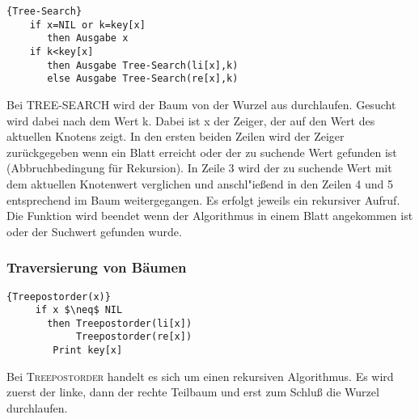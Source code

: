   \begin{Algorithmus}[H]
    \begin{lstlisting}[frame=tlrb, mathescape=true, title=\textsc{Tree-Search}, gobble=4]{Tree-Search}
    if x=NIL or k=key[x]
       then Ausgabe x
    if k<key[x]
       then Ausgabe Tree-Search(li[x],k)
       else Ausgabe Tree-Search(re[x],k)
    \end{lstlisting}

    Bei \textsc{TREE-SEARCH} wird der Baum von der Wurzel aus durchlaufen. 
    Gesucht wird dabei nach dem Wert k. Dabei ist x der Zeiger, der auf den 
    Wert des aktuellen Knotens zeigt. In den ersten beiden Zeilen 
    wird der Zeiger zurückgegeben wenn ein Blatt erreicht oder der 
    zu suchende Wert gefunden ist (Abbruchbedingung für Rekursion). In 
    Zeile 3 wird der zu suchende Wert mit dem aktuellen Knotenwert 
    verglichen und anschl"ießend in den Zeilen 4 und 5 entsprechend im 
    Baum weitergegangen. Es erfolgt jeweils ein rekursiver Aufruf.\\
    Die Funktion wird beendet wenn der Algorithmus in einem Blatt 
    angekommen ist oder der Suchwert gefunden wurde.
    \end{Algorithmus}
 
 \subsubsection{Traversierung von Bäumen}
   \begin{Algorithmus}[H]
   \begin{lstlisting}[frame=tlrb, mathescape=true, title=\textsc{Treepostorder\textnormal{(x)}}, gobble=4]{Treepostorder(x)}
     if x $\neq$ NIL
       then Treepostorder(li[x])
            Treepostorder(re[x])
	    Print key[x]
    \end{lstlisting}

   Bei \textsc{Treepostorder} handelt es sich um einen rekursiven Algorithmus.
   Es wird zuerst der linke, dann der rechte Teilbaum und erst zum Schluß die Wurzel durchlaufen.
   \end{Algorithmus}

